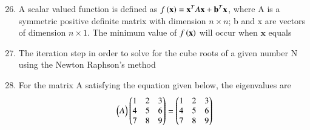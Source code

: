\documentclass[journal,12pt,onecolumn]{IEEEtran}
\theoremstyle{remark}
\begin{document}
\clearpage
\begin{enumerate}
\setcounter{enumi}{25}
    \item A scalar valued function is defined as $f\left(\mathbf{x}\right) = \mathbf{x}^T A \mathbf{x} + \mathbf{b}^T \mathbf{x}$, where A is a symmetric positive definite matrix with dimension $n \times n$; b and x are vectors of dimension $n \times 1$. The minimum value of $f\left(\mathbf{x}\right)$ will occur when $\mathbf{x}$ equals
    
    \hfill{}
        \begin{enumerate}
        \end{enumerate}

    \item The iteration step in order to solve for the cube roots of a given number N using the Newton Raphson's method

    \hfill{}
        \begin{enumerate}
        \end{enumerate}
    
    \item For the matrix A satisfying the equation given below, the eigenvalues are
    \begin{align*}
        \begin{pmatrix}A\end{pmatrix}\begin{pmatrix}1 & 2 & 3 \\ 4 & 5 & 6 \\ 7 & 8 & 9\end{pmatrix}
         = \begin{pmatrix}1 & 2 & 3 \\ 4 & 5 & 6 \\ 7 & 8 & 9 \end{pmatrix}
    \end{align*}


\end{enumerate}
\end{document}
